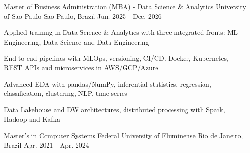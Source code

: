

\begin{cventries}

  \cventry
    {Master of Business Administration (MBA) - Data Science \& Analytics} %
    {University of São Paulo} %
    {São Paulo, Brazil} %
    {Jun. 2025 - Dec. 2026} %
    {
      \begin{cvitems} %
        \item {Applied training in Data Science \& Analytics with three integrated fronts: ML Engineering, Data Science and Data Engineering}
        \item {End-to-end pipelines with MLOps, versioning, CI/CD, Docker, Kubernetes, REST APIs and microservices in AWS/GCP/Azure}
        \item {Advanced EDA with pandas/NumPy, inferential statistics, regression, classification, clustering, NLP, time series}
        \item {Data Lakehouse and DW architectures, distributed processing with Spark, Hadoop and Kafka}
      \end{cvitems}
    }

  \cventry
    {Master's in Computer Systems} %
    {Federal University of Fluminense} %
    {Rio de Janeiro, Brazil} %
    {Apr. 2021 - Apr. 2024} %
    {
      \begin{cvitems} %
      \end{cvitems}
    }


\end{cventries}
